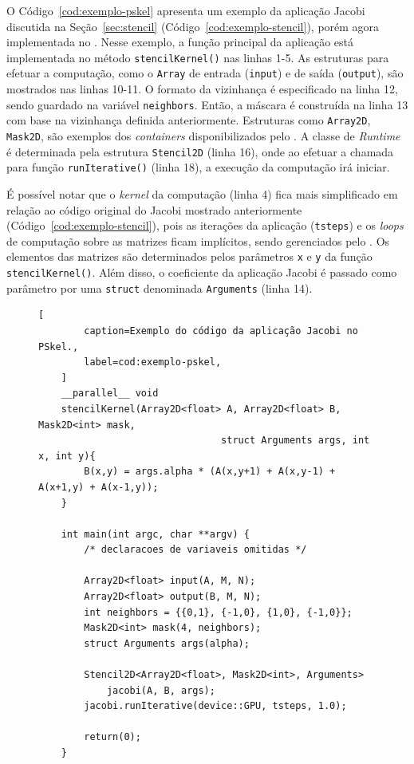 O Código~\ref{cod:exemplo-pskel} apresenta um exemplo da aplicação Jacobi discutida na
Seção~\ref{sec:stencil} (Código~\ref{cod:exemplo-stencil}), porém agora implementada no \fw \pskel.
Nesse exemplo, a função \stencil principal da aplicação está implementada no método \texttt{stencilKernel()} nas linhas 1-5.
As estruturas para efetuar a computação, como o \texttt{Array} de entrada (\texttt{input}) e de saída (\texttt{output}), são mostrados nas linhas 10-11.
O formato da vizinhança é especificado na linha 12, sendo guardado na variável \texttt{neighbors}.
Então, a máscara é construída na linha 13 com base na vizinhança definida anteriormente.
Estruturas como \texttt{Array2D}, \texttt{Mask2D}, são exemplos dos
\textit{containers} disponibilizados pelo \fw. A classe de \textit{Runtime} é
determinada pela estrutura \texttt{Stencil2D} (linha 16), onde ao efetuar a chamada para
função \texttt{runIterative()} (linha 18), a execução da computação irá iniciar.


É possível notar que o \textit{kernel} da computação \stencil (linha 4) fica mais simplificado em relação ao
código original do Jacobi mostrado anteriormente (Código~\ref{cod:exemplo-stencil}), pois as iterações da aplicação
(\texttt{tsteps}) e os \textit{loops} de computação sobre as matrizes ficam implícitos, sendo
gerenciados pelo \fw. Os elementos das matrizes são determinados pelos
parâmetros \texttt{x} e \texttt{y} da função \texttt{stencilKernel()}. Além disso, o coeficiente
da aplicação Jacobi é passado como parâmetro por uma \texttt{struct} denominada
\texttt{Arguments} (linha 14).

\begin{figure}[t]
	\begin{lstlisting}[
		caption=Exemplo do código da aplicação Jacobi no PSkel.,
		label=cod:exemplo-pskel,
	]
	__parallel__ void
	stencilKernel(Array2D<float> A, Array2D<float> B, Mask2D<int> mask,
								struct Arguments args, int x, int y){
		B(x,y) = args.alpha * (A(x,y+1) + A(x,y-1) + A(x+1,y) + A(x-1,y));
	}

	int main(int argc, char **argv) {
		/* declaracoes de variaveis omitidas */

		Array2D<float> input(A, M, N);
		Array2D<float> output(B, M, N);
		int neighbors = {{0,1}, {-1,0}, {1,0}, {-1,0}};
		Mask2D<int> mask(4, neighbors);
		struct Arguments args(alpha);

		Stencil2D<Array2D<float>, Mask2D<int>, Arguments>
			jacobi(A, B, args);
		jacobi.runIterative(device::GPU, tsteps, 1.0);

		return(0);
	}
\end{lstlisting}
\end{figure}
